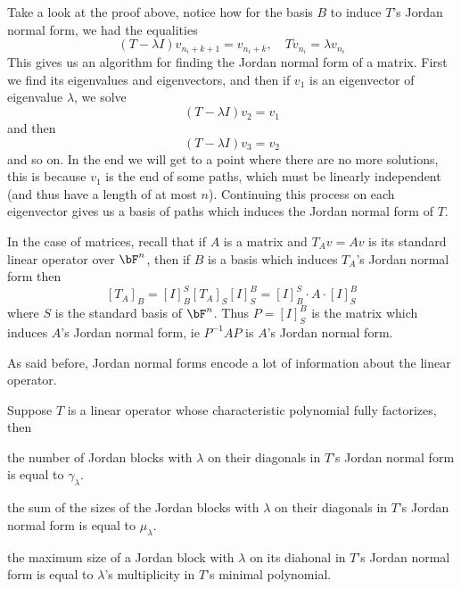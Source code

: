 \begin{note}

    Take a look at the proof above, notice how for the basis $B$ to induce $T$'s Jordan normal form, we had the equalities
    \[ (T-\lambda I)v_{n_i+k+1} = v_{n_i+k},\quad Tv_{n_i} = \lambda v_{n_i} \]
    This gives us an algorithm for finding the Jordan normal form of a matrix.
    First we find its eigenvalues and eigenvectors, and then if $v_1$ is an eigenvector of eigenvalue $\lambda$, we solve
    \[ (T-\lambda I)v_2 = v_1 \]
    and then
    \[ (T-\lambda I)v_3 = v_2 \]
    and so on.
    In the end we will get to a point where there are no more solutions, this is because $v_1$ is the end of some paths, which must be linearly independent (and thus have a length of at most $n$).
    Continuing this process on each eigenvector gives us a basis of paths which induces the Jordan normal form of $T$.

\end{note}

\begin{note}

    In the case of matrices, recall that if $A$ is a matrix and $T_Av=Av$ is its standard linear operator over $\bF^n$, then if $B$ is a basis which induces $T_A$'s Jordan normal form then
    \[ [T_A]_B = [I]^S_B[T_A]_S[I]^B_S = [I]^S_B\cdot A\cdot [I]^B_S\]
    where $S$ is the standard basis of $\bF^n$.
    Thus $P=[I]^B_S$ is the matrix which induces $A$'s Jordan normal form, ie $P^{-1}AP$ is $A$'s Jordan normal form.

\end{note}

As said before, Jordan normal forms encode a lot of information about the linear operator.

\begin{thrm*}

    Suppose $T$ is a linear operator whose characteristic polynomial fully factorizes, then
    \benum
        \item the number of Jordan blocks with $\lambda$ on their diagonals in $T$'s Jordan normal form is equal to $\gamma_\lambda$.
        \item the sum of the sizes of the Jordan blocks with $\lambda$ on their diagonals in $T$'s Jordan normal form is equal to $\mu_\lambda$.
        \item the maximum size of a Jordan block with $\lambda$ on its diahonal in $T$'s Jordan normal form is equal to $\lambda$'s multiplicity in $T$'s minimal polynomial.
    \eenum

\end{thrm*}

